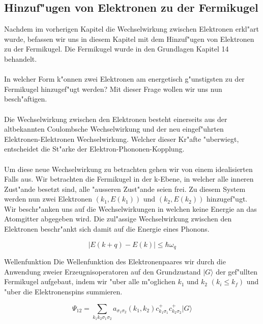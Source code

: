\begin{refsection}
\section{Hinzuf"ugen von Elektronen zu der Fermikugel}
Nachdem im vorherigen Kapitel die Wechselwirkung zwischen Elektronen erkl"art wurde, befassen wir uns in diesem Kapitel mit dem Hinzuf"ugen von Elektronen zu der Fermikugel. Die Fermikugel wurde in den Grundlagen Kapitel 14 behandelt.
\\
\\
In welcher Form k"onnen zwei Elektronen am energetisch g"unstigsten zu der Fermikugel hinzugef"ugt werden? Mit dieser Frage wollen wir uns nun besch"aftigen.
\\
\\
Die Wechselwirkung zwischen den Elektronen besteht einerseits aus der altbekannten Coulombsche Wechselwirkung und der neu eingef"uhrten Elektronen-Elektronen Wechselwirkung. Welcher dieser Kr"afte "uberwiegt, entscheidet die St"arke der Elektron-Phononen-Kopplung.
\\
\\
Um diese neue Wechselwirkung zu betrachten gehen wir von einem idealisierten Falls aus. Wir betrachten die Fermikugel in der k-Ebene, in welcher alle inneren Zust"ande besetzt sind, alle "ausseren Zust"ande seien frei. Zu diesem System werden nun zwei Elektronen $(k_1,E(k_1))$ und $(k_2,E(k_2))$ hinzugef"ugt. Wir beschr"anken uns auf die Wechselwirkungen in welchen keine Energie an das Atomgitter abgegeben wird. Die zul"assige Wechselwirkung zwischen den Elektronen beschr"ankt sich damit auf die Energie eines Phonons.

\[
|E(k+q)-E(k)|\le\hbar\omega_q
\]

Wellenfunktion
Die Wellenfunktion des Elektronenpaares wir durch die Anwendung zweier Erzeugnisoperatoren auf den Grundzustand $|G\rangle$ der gef"ullten Fermikugel aufgebaut, indem wir "uber alle m"oglichen $k_1$ und $k_2$ $(k_i \le k_f)$ und "uber die Elektronenspins summieren.

\[
\Psi_{12}=\sum \limits_{k_1k_2\sigma_1\sigma_2} a_{\sigma_1\sigma_2}(k_1,k_2)c^+_{k_1\sigma_1}c^+_{k_2\sigma_2}|G\rangle
\]


\end{refsection}
